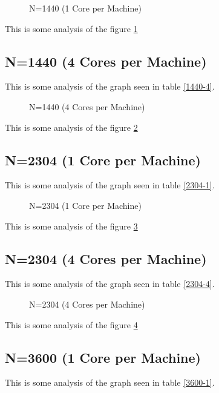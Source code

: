 \documentclass[a4paper]{article}
\begin{document}
\begin{figure}
    
    \caption{N=1440 (1 Core per Machine)}
    \label{fig:1440_1}
\end{figure}

This is some analysis of the figure \ref{fig:1440_1}

\subsection{N=1440 (4 Cores per Machine)}

This is some analysis of the graph seen in table \ref{1440-4}.

\begin{figure}
    
    \caption{N=1440 (4 Cores per Machine)}
    \label{fig:1440_4}
\end{figure}

This is some analysis of the figure \ref{fig:1440_4}

\subsection{N=2304 (1 Core per Machine)}

This is some analysis of the graph seen in table \ref{2304-1}.

\begin{figure}
    
    \caption{N=2304 (1 Core per Machine)}
    \label{fig:2304_1}
\end{figure}

This is some analysis of the figure \ref{fig:2304_1}

\subsection{N=2304 (4 Cores per Machine)}

This is some analysis of the graph seen in table \ref{2304-4}.

\begin{figure}
    
    \caption{N=2304 (4 Cores per Machine)}
    \label{fig:2304_4}
\end{figure}

This is some analysis of the figure \ref{fig:2304_4}

\subsection{N=3600 (1 Core per Machine)}

This is some analysis of the graph seen in table \ref{3600-1}.
\end{document}
